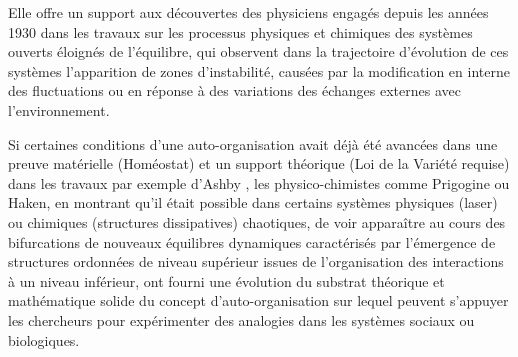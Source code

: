 



Elle offre un support aux découvertes des physiciens engagés depuis les années 1930 dans les travaux sur les processus physiques et chimiques des systèmes ouverts éloignés de l'équilibre, qui observent dans la trajectoire d'évolution de ces systèmes l'apparition de zones d'instabilité, causées par la modification en interne des fluctuations ou en réponse à des variations des échanges externes avec l'environnement.

Si certaines conditions d'une auto-organisation avait déjà été avancées dans une preuve matérielle (Homéostat) et un support théorique (Loi de la Variété requise) dans les travaux par exemple d'Ashby \autocite[800-801]{Pouvreau2013}, les physico-chimistes comme Prigogine ou Haken, en montrant qu'il était possible dans certains systèmes physiques (laser) ou chimiques (structures dissipatives) chaotiques, de voir apparaître au cours des bifurcations de nouveaux équilibres dynamiques caractérisés par l'émergence de structures ordonnées de niveau supérieur issues de l'organisation des interactions à un niveau inférieur, ont fourni une évolution du substrat théorique et mathématique solide du concept d'auto-organisation sur lequel peuvent s'appuyer les chercheurs pour expérimenter des analogies dans les systèmes sociaux ou biologiques.



